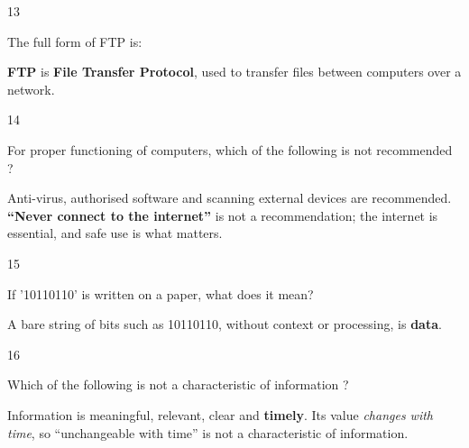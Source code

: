 \begin{question}{13}
{The full form of FTP is:\par}
\begin{explain}
\textbf{FTP} is \textbf{File Transfer Protocol}, used to transfer files between computers over a network.
\end{explain}
\end{question}

\begin{question}{14}
{For proper functioning of computers, which of the following is not recommended ?\par}
\begin{explain}
Anti-virus, authorised software and scanning external devices are recommended. \textbf{``Never connect to the internet''} is not a recommendation; the internet is essential, and safe use is what matters.
\end{explain}
\end{question}

\begin{question}{15}
{If '10110110' is written on a paper, what does it mean?\par}
\begin{explain}
A bare string of bits such as 10110110, without context or processing, is \textbf{data}.
\end{explain}
\end{question}

\begin{question}{16}
{Which of the following is not a characteristic of information ?\par}
\begin{explain}
Information is meaningful, relevant, clear and \textbf{timely}. Its value \emph{changes with time}, so ``unchangeable with time'' is not a characteristic of information.
\end{explain}
\end{question}


